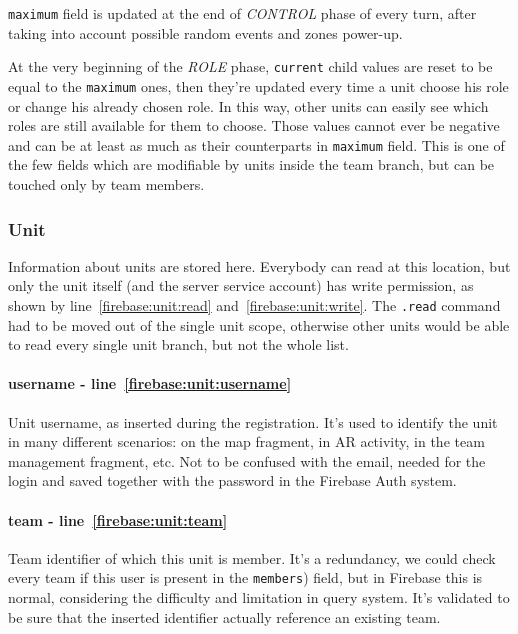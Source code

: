 				\lstinline|maximum| field is updated at the end of \emph{CONTROL} phase of every turn, after taking into account possible random events and zones power-up.
				
				At the very beginning of the \emph{ROLE} phase, \lstinline|current| child values are reset to be equal to the \lstinline|maximum| ones, then they're updated every time a unit choose his role or change his already chosen role. In this way, other units can easily see which roles are still available for them to choose.
				Those values cannot ever be negative and can be at least as much as their counterparts in \lstinline|maximum| field.
				This is one of the few fields which are modifiable by units inside the team branch, but can be touched only by team members.
			
			\subsubsection{Unit}
			
				
			
				Information about units are stored here.
				Everybody can read at this location, but only the unit itself (and the server service account) has write permission, as shown by line~\ref{firebase:unit:read} and~\ref{firebase:unit:write}.
				The \lstinline|.read| command had to be moved out of the single unit scope, otherwise other units would be able to read every single unit branch, but not the whole list.
			
				\paragraph{username - line~\ref{firebase:unit:username}}
				Unit username, as inserted during the registration. It's used to identify the unit in many different scenarios: on the map fragment, in AR activity, in the team management fragment, etc. Not to be confused with the email, needed for the login and saved together with the password in the Firebase Auth system.
			
				\paragraph{team - line~\ref{firebase:unit:team}}
				Team identifier of which this unit is member. It's a redundancy, we could check every team if this user is present in the \lstinline|members|) field, but in Firebase this is normal, considering the difficulty and limitation in query system.
				It's validated to be sure that the inserted identifier actually reference an existing team.
			
